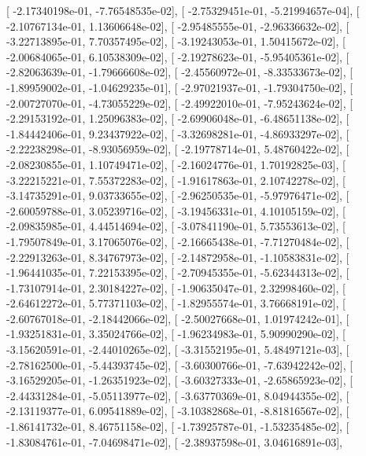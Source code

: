 \documentclass{article}
\begin{document}
       [ -2.17340198e-01,  -7.76548535e-02],
       [ -2.75329451e-01,  -5.21994657e-04],
       [ -2.10767134e-01,   1.13606648e-02],
       [ -2.95485555e-01,  -2.96336632e-02],
       [ -3.22713895e-01,   7.70357495e-02],
       [ -3.19243053e-01,   1.50415672e-02],
       [ -2.00684065e-01,   6.10538309e-02],
       [ -2.19278623e-01,  -5.95405361e-02],
       [ -2.82063639e-01,  -1.79666608e-02],
       [ -2.45560972e-01,  -8.33533673e-02],
       [ -1.89959002e-01,  -1.04629235e-01],
       [ -2.97021937e-01,  -1.79304750e-02],
       [ -2.00727070e-01,  -4.73055229e-02],
       [ -2.49922010e-01,  -7.95243624e-02],
       [ -2.29153192e-01,   1.25096383e-02],
       [ -2.69906048e-01,  -6.48651138e-02],
       [ -1.84442406e-01,   9.23437922e-02],
       [ -3.32698281e-01,  -4.86933297e-02],
       [ -2.22238298e-01,  -8.93056959e-02],
       [ -2.19778714e-01,   5.48760422e-02],
       [ -2.08230855e-01,   1.10749471e-02],
       [ -2.16024776e-01,   1.70192825e-03],
       [ -3.22215221e-01,   7.55372283e-02],
       [ -1.91617863e-01,   2.10742278e-02],
       [ -3.14735291e-01,   9.03733655e-02],
       [ -2.96250535e-01,  -5.97976471e-02],
       [ -2.60059788e-01,   3.05239716e-02],
       [ -3.19456331e-01,   4.10105159e-02],
       [ -2.09835985e-01,   4.44514694e-02],
       [ -3.07841190e-01,   5.73553613e-02],
       [ -1.79507849e-01,   3.17065076e-02],
       [ -2.16665438e-01,  -7.71270484e-02],
       [ -2.22913263e-01,   8.34767973e-02],
       [ -2.14872958e-01,  -1.10583831e-02],
       [ -1.96441035e-01,   7.22153395e-02],
       [ -2.70945355e-01,  -5.62344313e-02],
       [ -1.73107914e-01,   2.30184227e-02],
       [ -1.90635047e-01,   2.32998460e-02],
       [ -2.64612272e-01,   5.77371103e-02],
       [ -1.82955574e-01,   3.76668191e-02],
       [ -2.60767018e-01,  -2.18442066e-02],
       [ -2.50027668e-01,   1.01974242e-01],
       [ -1.93251831e-01,   3.35024766e-02],
       [ -1.96234983e-01,   5.90990290e-02],
       [ -3.15620591e-01,  -2.44010265e-02],
       [ -3.31552195e-01,   5.48497121e-03],
       [ -2.78162500e-01,  -5.44393745e-02],
       [ -3.60300766e-01,  -7.63942242e-02],
       [ -3.16529205e-01,  -1.26351923e-02],
       [ -3.60327333e-01,  -2.65865923e-02],
       [ -2.44331284e-01,  -5.05113977e-02],
       [ -3.63770369e-01,   8.04944355e-02],
       [ -2.13119377e-01,   6.09541889e-02],
       [ -3.10382868e-01,  -8.81816567e-02],
       [ -1.86141732e-01,   8.46751158e-02],
       [ -1.73925787e-01,  -1.53235485e-02],
       [ -1.83084761e-01,  -7.04698471e-02],
       [ -2.38937598e-01,   3.04616891e-03],
\end{document}
